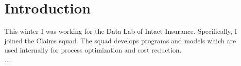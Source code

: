 \section{Introduction}
This winter I was working for the Data Lab of Intact Insurance. Specifically, I joined the Claims squad. The squad develops programs and models which are used internally for process optimization and cost reduction.\\

....

	